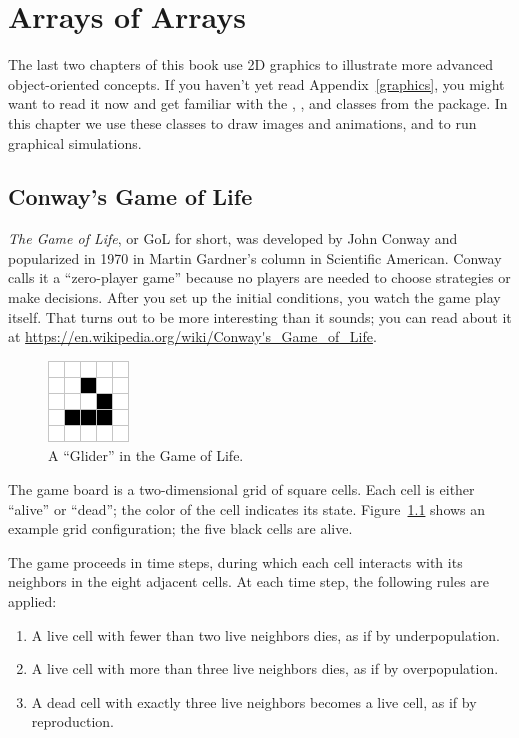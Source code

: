 \chapter{Arrays of Arrays}
\label{conway}

The last two chapters of this book use 2D graphics to illustrate more advanced object-oriented concepts.
If you haven't yet read Appendix~\ref{graphics}, you might want to read it now and get familiar with the , , and  classes from the  package.
In this chapter we use these classes to draw images and animations, and to run graphical simulations.


\section{Conway's Game of Life}

{\it The Game of Life}, or GoL for short, was developed by John Conway and popularized in 1970 in Martin Gardner's column in Scientific American.
Conway calls it a ``zero-player game'' because no players are needed to choose strategies or make decisions.
After you set up the initial conditions, you watch the game play itself.
That turns out to be more interesting than it sounds; you can read about it at \url{https://en.wikipedia.org/wiki/Conway's_Game_of_Life}.

\begin{figure}[!ht]
\begin{center}
\includegraphics{figs/glider.png}
\caption{A ``Glider'' in the Game of Life.}
\label{fig:glider}
\end{center}
\end{figure}

The game board is a two-dimensional grid of square cells.
Each cell is either ``alive'' or ``dead''; the color of the cell indicates its state.
Figure~\ref{fig:glider} shows an example grid configuration; the five black cells are alive.


The game proceeds in time steps, during which each cell interacts with its neighbors in the eight adjacent cells.
At each time step, the following rules are applied:

\begin{enumerate}
\small
\item A live cell with fewer than two live neighbors dies, as if by underpopulation.
\item A live cell with more than three live neighbors dies, as if by overpopulation.
\item A dead cell with exactly three live neighbors becomes a live cell, as if by reproduction.
\end{enumerate}

